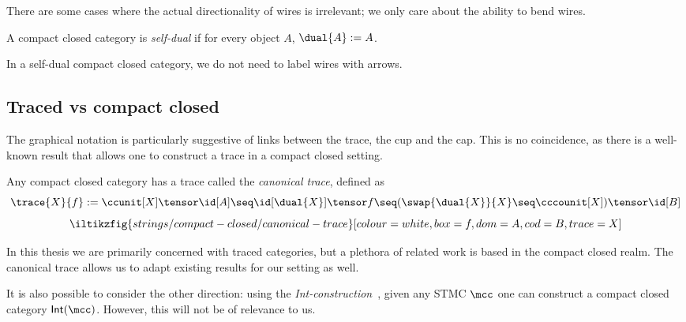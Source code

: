 

There are some cases where the actual directionality of wires is irrelevant;
we only care about the ability to bend wires.

\begin{definition}
    A compact closed category is \emph{self-dual} if for every object \(A\),
    \(\dual{A} := A\).
\end{definition}

In a self-dual compact closed category, we do not need to label wires with
arrows.

\subsection{Traced vs compact closed}

The graphical notation is particularly suggestive of links between the
trace, the cup and the cap.
This is no coincidence, as there is a well-known result that allows one to
construct a trace in a compact closed setting.

\begin{proposition}
    \label{prop:canonical-trace}
    Any compact closed category has a trace called the \emph{canonical trace},
    defined as \[
        \trace{X}{f}
        :=
        \ccunit[X] \tensor \id[A]
        \seq
        \id[\dual{X}] \tensor f
        \seq
        (\swap{\dual{X}}{X} \seq \cccounit[X]) \tensor \id[B]
    \]
    \[
        \iltikzfig{strings/compact-closed/canonical-trace}[colour=white,box=f,dom=A,cod=B,trace=X]
    \]
\end{proposition}

In this thesis we are primarily concerned with traced categories, but a plethora
of related work is based in the compact closed realm.
The canonical trace allows us to adapt existing results for our setting as well.

\begin{remark}
    It is also possible to consider the other direction: using the
    \emph{Int-construction}~\cite{joyal1996traced}, given any STMC
    \(\mcc\) one can construct a compact closed category \(\mathsf{Int}(\mcc)\).
    However, this will not be of relevance to us.
\end{remark}